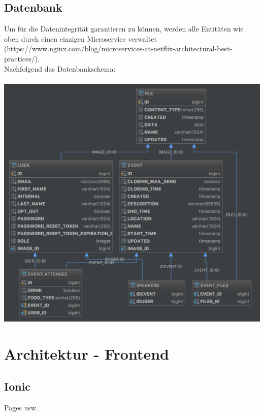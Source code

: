 \documentclass[11pt]{article} %
\begin{document}
\newpage
\subsection{Datenbank}
Um für die Datenintegrität garantieren zu können, werden alle Entitäten wie oben durch einen einzigen Microservice verwaltet (https://www.nginx.com/blog/microservices-at-netflix-architectural-best-practices/).
\\
Nachfolgend das Datenbankschema:
\\
\\
\includegraphics[width=1\textwidth]{dbSchema}
\\

\newpage
\section{Architektur - Frontend}
\subsection{Ionic}
Pages usw.




\newpage
\end{document}
